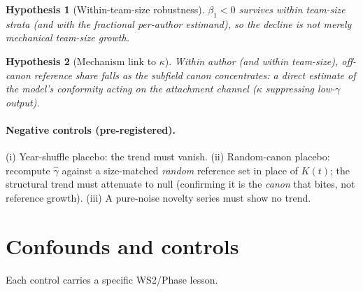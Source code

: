 \documentclass[11pt,letterpaper]{article}
\theoremstyle{definition}
\theoremstyle{plain}
\newtheorem{hypothesis}{Hypothesis}
\begin{document}
\begin{hypothesis}[Within-team-size robustness]\label{hyp:withinteam}
$\beta_1<0$ survives \emph{within} team-size strata (and with the fractional
per-author estimand), so the decline is not merely mechanical team-size growth.
\end{hypothesis}

\begin{hypothesis}[Mechanism link to $\kappa$]\label{hyp:mech}
Within author (and within team-size), off-canon reference share falls as the
subfield canon concentrates: a direct estimate of the model's conformity acting
on the attachment channel ($\kappa$ suppressing low-$\gamma$ output).
\end{hypothesis}

\paragraph{Negative controls (pre-registered).} (i) Year-shuffle placebo: the
trend must vanish. (ii) Random-canon placebo: recompute $\hat\gamma$ against a
size-matched \emph{random} reference set in place of $K(t)$; the structural trend
must attenuate to null (confirming it is the \emph{canon} that bites, not
reference growth). (iii) A pure-noise novelty series must show no trend.

\section{Confounds and controls}\label{sec:controls}

Each control carries a specific WS2/Phase lesson.
\end{document}

